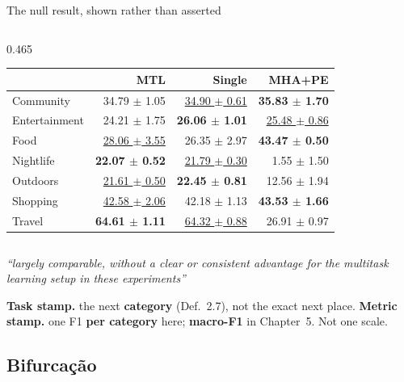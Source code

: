 \documentclass{beamer}
\begin{document}
\begin{frame}{The null result, shown rather than asserted}
\begin{columns}[t,onlytextwidth]
\begin{column}{0.465\textwidth}
{\begin{tabular}{@{}lrrr@{}}
                \toprule
                 & \textbf{MTL} & \textbf{Single} & \textbf{MHA+PE} \\
                \midrule
                Community     & 34.79 $\pm$ 1.05             & \underline{34.90 $\pm$ 0.61} & \textbf{35.83 $\pm$ 1.70} \\
                Entertainment & 24.21 $\pm$ 1.75             & \textbf{26.06 $\pm$ 1.01}    & \underline{25.48 $\pm$ 0.86} \\
                Food          & \underline{28.06 $\pm$ 3.55} & 26.35 $\pm$ 2.97             & \textbf{43.47 $\pm$ 0.50} \\
                Nightlife     & \textbf{22.07 $\pm$ 0.52}    & \underline{21.79 $\pm$ 0.30} & 1.55 $\pm$ 1.50 \\
                Outdoors      & \underline{21.61 $\pm$ 0.50} & \textbf{22.45 $\pm$ 0.81}    & 12.56 $\pm$ 1.94 \\
                Shopping      & \underline{42.58 $\pm$ 2.06} & 42.18 $\pm$ 1.13             & \textbf{43.53 $\pm$ 1.66} \\
                Travel        & \textbf{64.61 $\pm$ 1.11}    & \underline{64.32 $\pm$ 0.88} & 26.91 $\pm$ 0.97 \\
                \bottomrule
            \end{tabular}\par}
        \end{column}
    \end{columns}

    \begin{alertblock}{}
        \centering\scriptsize \textit{``largely comparable, without a clear or consistent advantage for the multitask learning setup in these experiments''}
    \end{alertblock}

    {\scriptsize\color{secondary}\textbf{Task stamp.} the next \textbf{category} (Def.~2.7), not the exact next place. \quad\textbf{Metric stamp.} one F1 \textbf{per category} here; \textbf{macro-F1} in Chapter~5. Not one scale.\par}
\end{frame}

\subsection{Bifurcação}
\end{document}
